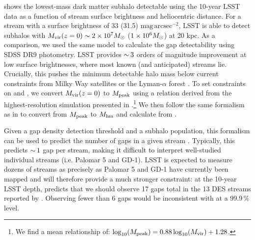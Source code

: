  shows the lowest-mass dark matter subhalo detectable using the 10-year LSST data as a function of stream surface brightness and heliocentric distance. For a stream with a surface brightness of 33 (31.5) $\mathrm{mag}\,\mathrm{arcsec}^{-2}$, LSST is able to detect subhalos with $M_{\rm vir}(z=0) \sim 2 \times 10^7 M_\odot$ ($1 \times 10^6 M_\odot$) at 20 kpc.
As a comparison, we used the same model to calculate the gap detectability using SDSS DR9 photometry. LSST provides $ {\sim}\, 3$ orders of magnitude improvement at low surface brightnesses, where most known (and anticipated) streams lie. Crucially, this pushes the minimum detectable halo mass below current constraints from Milky Way satellites \citep[\eg,][]{Nadler:2018,Jethwa:2018,Kim:2017iwr} or the Lyman-$\alpha$ forest \citep[\eg,][]{2017PhRvD..96b3522I}.
To set constraints on \Mhm and \mWDM, we convert $M_{\rm vir}(z=0)$ to $M_{\rm peak}$ using a relation derived from the highest-resolution simulation presented in \citet{Mao2015}.\footnote{We find a mean relationship of: $\log_{10}(M_{\rm peak}) = 0.88 \log_{10}(M_{\rm vir}) + 1.28$.}
We then follow the same formalism as in  to convert from $M_{\rm peak}$ to $M_{\rm hm}$ and calculate \mWDM from .


Given a gap density detection threshold and a subhalo population, this formalism can be used to predict the number of gaps in a given stream \citep{erkal2016}. Typically, this predicts $ {\sim}\, 1$ gap per stream, making it difficult to interpret well-studied individual streams (i.e. Palomar 5 and GD-1). LSST is expected to measure dozens of streams as precisely as Palomar 5 and GD-1 have currently been mapped and will therefore provide a much stronger constraint: at the 10-year LSST depth, \LCDM predicts that we should observe 17 gaps total in the 13 DES streams reported by \cite{2018ApJ...862..114S}. Observing fewer than 6 gaps would be inconsistent with \LCDM at a 99.9\,\% level. 

